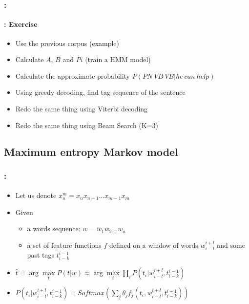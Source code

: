 \documentclass[xcolor=table]{beamer}
\begin{document}
\begin{frame}
	\frametitle{\insertshortsubtitle: \insertsection}
	\framesubtitle{\insertsubsection: Exercise}
	
	\begin{itemize}
		\item Use the previous corpus (example)
		\item Calculate $A$, $B$ and $Pi$ (train a HMM model)
		\item Calculate the approximate probability $P(PN\ VB\ VB | he\ can\ help)$
		\item Using greedy decoding, find tag sequence of the sentence 
		\item Redo the same thing using Viterbi decoding
		\item Redo the same thing using Beam Search (K=3)
	\end{itemize}
	
\end{frame}

\subsection{Maximum entropy Markov model}

\begin{frame}
	\frametitle{\insertshortsubtitle: \insertsection}
	\framesubtitle{\insertsubsection}

	\begin{itemize}
		\item Let us denote $x_{n}^{m} = x_n x_{n+1} \ldots x_{m-1} x_m$
		\item Given  
		\begin{itemize}
			\item a words sequence: $w = w_1 w_2 \ldots w_n$
			\item a set of feature functions $f$ defined on a window of words $w_{i-l}^{i+l}$ and some past tags $t_{i-k}^{i-1}$
		\end{itemize}
		\item $\hat{t} = \arg\max\limits_t P(t | w) \approx \arg\max\limits_t \prod\limits_{i}  P(t_i | w_{i-l}^{i+l}, t_{i-k}^{i-1})$
		\item $P(t_i | w_{i-l}^{i+l}, t_{i-k}^{i-1}) = Softmax(\sum_j \theta_j f_j(t_i, w_{i-l}^{i+l}, t_{i-k}^{i-1}))$
	\end{itemize}

\end{frame}
\end{document}

